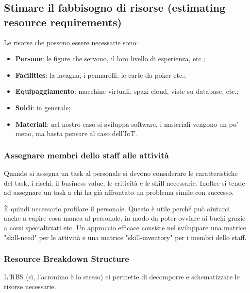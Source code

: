\subsection{Stimare il fabbisogno di risorse (estimating resource requirements)}
Le risorse che possono essere necessarie sono:
\begin{itemize}
	\item \textbf{Persone}: le figure che servono, il loro livello di esperienza, etc.;
	\item \textbf{Facilities}: la lavagna, i pennarelli, le carte da poker etc.;
	\item \textbf{Equipaggiamento}: macchine virtuali, spazi cloud, viste su database, etc.;
	\item \textbf{Soldi}: in generale;
	\item \textbf{Materiali}: nel nostro caso si sviluppa software, i materiali vengono un po' meno, ma basta pensare al caso dell'IoT.
\end{itemize}
\subsubsection{Assegnare membri dello staff alle attività}
Quando si assegna un task al personale si devono considerare le caratteristiche del task, i rischi, il business value, le criticità e le skill necessarie. Inoltre si tende ad assegnare un task a chi ha già affrontato un problema simile con successo.

\noindent È quindi necessario profilare il personale. Questo è utile perché può aiutarci anche a capire cosa manca al personale, in modo da poter ovviare ai buchi grazie a corsi specializzati etc. Un approccio efficace consiste nel sviluppare una matrice "skill-need" per le attività e una matrice "skill-inventory" per i membri dello staff.

\subsubsection{Resource Breakdown Structure}
L'RBS (sì, l'acronimo è lo stesso) ci permette di decomporre e schematizzare le risorse necessarie.
